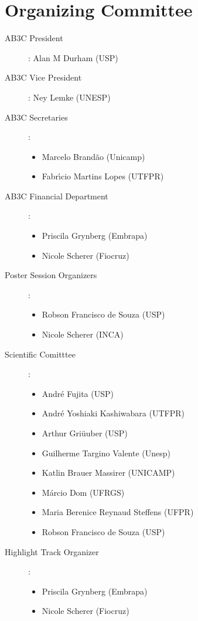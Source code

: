 
\chapter{Organizing Committee}

\begin{description}

 \item[AB3C President]: Alan M Durham (USP)

\item[AB3C Vice President]: Ney Lemke (UNESP)

  
\item[AB3C Secretaries]:

\begin{itemize}
 \item Marcelo Brand\~ao (Unicamp) 
 \item  Fabr\'{\i}cio Martins Lopes  (UTFPR)
\end{itemize}

\item[AB3C Financial Department]:

\begin{itemize}
\item Priscila Grynberg (Embrapa)
\item Nicole Scherer (Fiocruz)
\end{itemize}


\item[Poster Session Organizers]:

\begin{itemize}
  \item Robson Francisco de Souza (USP)
\item Nicole Scherer (INCA)
\end{itemize}

 \item[Scientific Comitttee]:

  \begin{itemize}
    \item  Andr\'e Fujita (USP)
    \item  Andr\'e Yoshiaki Kashiwabara (UTFPR)
    \item Arthur Gri\"uuber (USP)
    \item Guilherme Targino Valente (Unesp)
    \item Katlin Brauer Massirer (UNICAMP)
    \item M\'arcio Dom (UFRGS)
    \item Maria Berenice Reynaud Steffens (UFPR)
    \item Robson Francisco de Souza (USP)
  \end{itemize}
\item[Highlight Track Organizer]:
\begin{itemize}
\item Priscila Grynberg (Embrapa)
\item Nicole Scherer (Fiocruz)
\end{itemize} 
\end{description}


